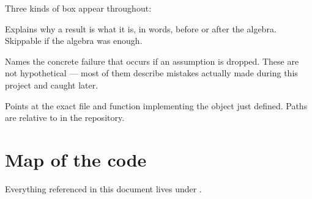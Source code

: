 Three kinds of box appear throughout:

\begin{intuition}
Explains why a result is what it is, in words, before or after the algebra. Skippable if the
algebra was enough.
\end{intuition}

\begin{pitfall}
Names the concrete failure that occurs if an assumption is dropped. These are not
hypothetical --- most of them describe mistakes actually made during this project and caught
later.
\end{pitfall}

\begin{codebox}
Points at the exact file and function implementing the object just defined. Paths are relative
to  in the repository.
\end{codebox}

\section{Map of the code}
\label{sec:codemap}

Everything referenced in this document lives under .


